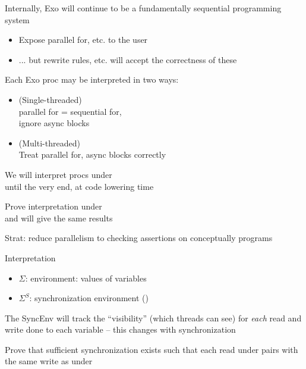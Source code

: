 \begin{minipage}[t]{0.48\textwidth}\fixminipage
Internally, Exo will continue to be a fundamentally sequential programming system
\begin{itemize}
  \item Expose parallel for, etc. to the user
  \item ... but rewrite rules, etc. will accept the correctness of these 
\end{itemize}
Each Exo proc may be interpreted in two ways:
\begin{itemize}
  \item {} (Single-threaded)\\parallel for = sequential for,\\ignore async blocks
  \item {} (Multi-threaded)\\Treat parallel for, async blocks correctly
\end{itemize}
We will interpret procs under \\until the very end, at code lowering time

Prove interpretation under \\and {} will give the same results

\end{minipage}
\hfill
\begin{minipage}[t]{0.48\textwidth}\fixminipage
Strat: reduce parallelism to checking assertions on conceptually  programs

Interpretation
\begin{itemize}
  \item $\Sigma$: environment: values of variables
  \item $\Sigma^S$: synchronization environment ()
\end{itemize}
\vspace{8mm}
The SyncEnv will track the ``visibility'' (which threads can see) for \textit{each} read and write done to each variable -- this changes with synchronization

Prove that sufficient synchronization exists such that each read under  pairs with the same write as under 
\end{minipage}
\vfill

